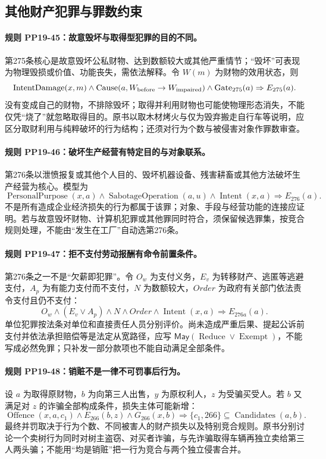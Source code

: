 \subsection{其他财产犯罪与罪数约束}
\paragraph{规则 PP19-45：故意毁坏与取得型犯罪的目的不同。}
\mbox{}\par
第275条核心是故意毁坏公私财物、达到数额较大或其他严重情节；“毁坏”可表现为物理毁损或价值、功能丧失，需依法解释。令 $W(m)$ 为财物的效用状态，则
\[
\operatorname{IntentDamage}(x,m)\land\operatorname{Cause}(a,W_{\rm before}\to W_{\rm impaired})
\land\operatorname{Gate}_{275}(a)
\Rightarrow E_{275}(a).
\]
没有变成自己的财物，不排除毁坏；取得并利用财物也可能使物理形态消失，不能仅凭“烧了”就忽略取得目的。原书以取木材烤火与仅为毁弃搬走自行车等说明，应区分取财利用与纯粹破坏的行为结构；还须对行为个数与被侵害对象作罪数审查。

\paragraph{规则 PP19-46：破坏生产经营有特定目的与对象联系。}
\mbox{}\par
第276条以泄愤报复或其他个人目的、毁坏机器设备、残害耕畜或其他方法破坏生产经营为核心。模型为
\[
\operatorname{PersonalPurpose}(x,a)
\land\operatorname{SabotageOperation}(a,u)
\land\operatorname{Intent}(x,a)\Rightarrow E_{276}(a).
\]
不是所有造成企业经济损失的行为都属于该罪；对象、手段与经营功能的连接应证明。若与故意毁坏财物、计算机犯罪或其他罪同时符合，须保留候选罪集，按竞合规则处理，不能由“发生在工厂”自动选第276条。

\paragraph{规则 PP19-47：拒不支付劳动报酬有命令前置条件。}
\mbox{}\par
第276条之一不是“欠薪即犯罪”。令 $O_w$ 为支付义务，$E_v$ 为转移财产、逃匿等逃避支付，$A_p$ 为有能力支付而不支付，$N$ 为数额较大，$Order$ 为政府有关部门依法责令支付且仍不支付：
\[
O_w\land(E_v\lor A_p)\land N\land Order
\land\operatorname{Intent}(x,a)
\Rightarrow E_{276a}(a).
\]
单位犯罪按法条对单位和直接责任人员分别评价。尚未造成严重后果、提起公诉前支付并依法承担赔偿等是法定从宽路径，应写 $\mathsf{May}(\operatorname{Reduce}\lor\operatorname{Exempt})$，不能写成必然免罪；只补发一部分款项也不能自动满足全部条件。

\paragraph{规则 PP19-48：销赃不是一律不可罚事后行为。}
\mbox{}\par
设 $a$ 为取得原财物，$b$ 为向第三人出售，$y$ 为原权利人，$z$ 为受骗买受人。若 $b$ 又满足对 $z$ 的诈骗全部构成条件，损失主体可能新增：
\[
\operatorname{Offence}(x,a,c_1)\land E_{266}(b,z)
\land G_{266}(x,b)\Rightarrow
\{c_1,266\}\subseteq\operatorname{Candidates}(a,b).
\]
最终并罚取决于行为个数、不同被害人的财产损失以及特别竞合规则。原书分别讨论一个卖树行为同时对树主盗窃、对买者诈骗，与先诈骗取得车辆再独立卖给第三人两头骗；不能用“均是销赃”把一行为竞合与两个独立侵害合并。

